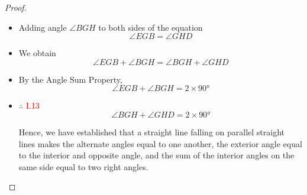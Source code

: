 \begin{proof}
\begin{itemize}
\item Adding angle $\angle{BGH}$ to both sides of the equation 
\[\angle{EGB} = \angle{GHD}\]

\item We obtain
\[\angle{EGB} + \angle{BGH} = \angle{BGH} + \angle{GHD}\]

\item By the Angle Sum Property,
\[\angle{EGB} + \angle{BGH} = 2\times\ang{90}\]

\item $\therefore$ \hfill\textcolor{red}{I.13}
\[\angle{BGH} + \angle{GHD} =2\times\ang{90}\]

\clearpage

Hence, we have established that a straight line falling on parallel straight lines makes the alternate angles equal to one another, the exterior angle equal to the interior and opposite angle, and the sum of the interior angles on the same side equal to two right angles. 

\end{itemize}

\end{proof}

\clearpage

